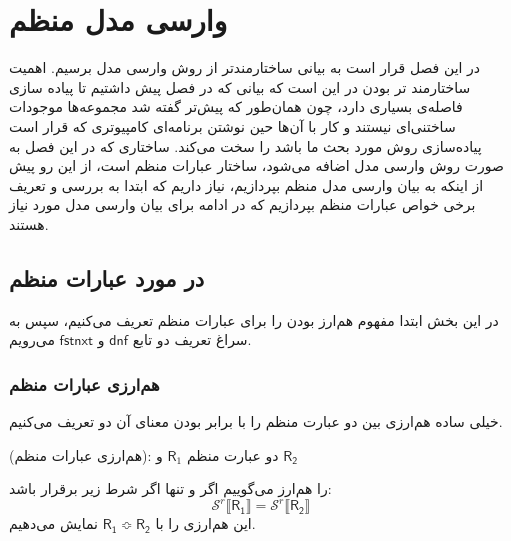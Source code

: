 \chapter{وارسی مدل منظم}
در این فصل قرار است به بیانی ساختارمندتر از روش وارسی مدل برسیم. اهمیت ساختارمند تر بودن در این است که بیانی که در فصل پیش داشتیم تا پیاده سازی فاصله‌ی بسیاری دارد، چون همان‌طور که پیش‌تر گفته شد مجموعه‌ها موجودات ساختنی‌ای نیستند و کار با آن‌ها حین نوشتن برنامه‌ای کامپیوتری‌ که قرار است پیاده‌سازی روش مورد بحث ما باشد را سخت می‌کند. ساختاری که در این فصل به صورت روش وارسی مدل اضافه می‌شود، ساختار عبارات منظم است، از این رو پیش از اینکه به بیان وارسی مدل منظم بپردازیم، نیاز داریم که ابتدا به بررسی و تعریف برخی خواص عبارات منظم بپردازیم که در ادامه برای بیان وارسی مدل مورد نیاز هستند.

\section{در مورد عبارات منظم}
در این بخش ابتدا مفهوم هم‌ارز بودن را برای عبارات منظم تعریف می‌کنیم، سپس به سراغ تعریف دو تابع 
$\mathsf{dnf}$
و 
$\mathsf{fstnxt}$
می‌رویم. 
\subsection{هم‌ارزی عبارات منظم}
‌خیلی ساده هم‌ارزی بین دو عبارت منظم را با برابر بودن معنای آن دو تعریف می‌کنیم.
\begin{defn}
	(هم‌ارزی عبارات منظم):
	دو عبارت منظم
	$\mathsf{R}_1$
	و
	$\mathsf{R_2}$

	 را هم‌ارز می‌گوییم اگر و تنها اگر شرط زیر برقرار باشد:
	 $$\mathcal{S}^r \llbracket \mathsf{R_1} \rrbracket = \mathcal{S}^r \llbracket \mathsf{R_2} \rrbracket$$ 
	 این هم‌ارزی را با 
	 $\mathsf{R_1} \Bumpeq \mathsf{R_2}$
	 نمایش می‌دهیم.
\end{defn}

